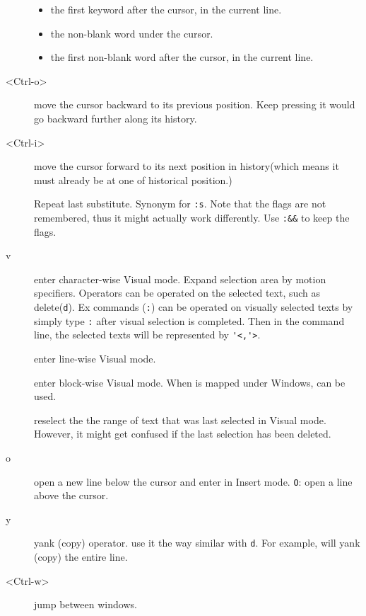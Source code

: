 \begin{description}
\begin{itemize}
  \item the first keyword after the cursor, in the current line.
  \item the non-blank word under the cursor.
  \item the first non-blank word after the cursor, in the current line.
\end{itemize}
\item[<Ctrl-o>] move the cursor backward to its previous position. Keep pressing it would go backward further along its history. 
\item[<Ctrl-i>] move the cursor forward to its next position in history(which means it must already be at one of historical position.)
\item[\syntax{&}] Repeat last substitute. Synonym for \verb|:s|. Note that the flags are not remembered, thus it might actually work differently. Use \verb|:&&| to keep the flags.
\item[v] enter character-wise Visual mode. Expand selection area by motion specifiers. Operators can be operated on the selected text, such as delete(\texttt{d}). Ex commands (\verb|:|) can be operated on visually selected texts by simply type \verb|:| after visual selection is completed. Then in the command line, the selected texts will be represented by \verb|'<,'>|.
\item[\syntax{V}] enter line-wise Visual mode.
\item[\syntax{<C-v>}] enter block-wise Visual mode. When  is mapped under Windows,  can be used.
\item[\syntax{gv}] reselect the the range of text that was last selected in Visual mode. However, it might get confused if the last selection has been deleted.
\item[o] open a new line below the cursor and enter in Insert mode. \texttt{O}: open a line above the cursor.
\item[y] yank (copy) operator. use it the way similar with \texttt{d}. For example,  will yank (copy) the entire line.
\item[<Ctrl-w>] jump between windows.


\end{description}
